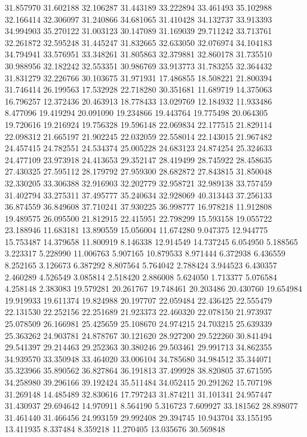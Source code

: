 31.857970
31.602188
32.106287
31.443189
33.222894
33.461493
35.102988
32.166414
32.306097
31.240866
34.681065
31.410428
34.132737
33.913393
34.994903
35.270122
31.003123
30.147089
31.169039
29.711242
33.713761
32.261872
32.595248
31.445247
31.832665
32.633050
32.076974
34.104183
34.794941
33.576951
33.348261
31.805863
32.379881
32.860178
31.735510
30.988956
32.182242
32.553351
30.986769
33.913773
31.783255
32.364432
31.831279
32.226766
30.103675
31.971931
17.486855
18.508221
21.800394
31.746414
26.199563
17.532928
22.718280
30.351681
11.689719
14.375063
16.796257
12.372436
20.463913
18.778433
13.029769
12.184932
11.933486
8.477096
19.419294
20.091090
19.234866
19.443764
19.775498
20.064305
19.720616
19.216924
19.756328
19.596148
22.069834
22.177515
21.829114
22.098312
21.665197
21.902245
22.032059
22.558014
22.143015
21.967482
24.457415
24.782551
24.534374
25.005228
24.683123
24.874254
25.324633
24.477109
23.973918
24.413653
29.352147
28.419499
28.745922
28.458635
27.430325
27.595112
28.179792
27.959300
28.682872
27.843815
31.850048
32.330205
33.306388
32.916903
32.202779
32.958721
32.989138
33.757459
31.402794
33.275311
37.495777
35.240634
32.928069
40.313443
37.256133
36.874559
36.849608
37.710241
37.930225
36.998777
16.978218
11.912808
19.489575
26.095500
21.812915
22.415951
22.798299
15.593158
19.055722
23.188946
11.683181
13.890559
15.056004
11.674280
9.047375
12.944775
15.753487
14.379658
11.800919
8.146338
12.914549
14.737245
6.054950
5.188565
3.223317
5.228990
11.006763
5.907165
10.879533
8.971444
6.372938
6.436559
8.252165
3.126673
6.387292
8.807564
5.764042
2.788424
3.944523
6.430357
2.460289
4.526549
3.085814
2.518420
2.886008
5.624050
1.713377
5.076584
4.258148
2.383083
19.579281
20.261767
19.748461
20.203486
20.430760
19.654984
19.919933
19.611374
19.824988
20.197707
22.059484
22.436425
22.555479
22.131530
22.252156
22.251689
21.923373
22.460320
22.078150
21.973937
25.078509
26.166981
25.425659
25.108670
24.974215
24.703215
25.639339
25.363262
24.903781
24.878767
30.121620
28.927200
29.522260
30.841494
29.541397
29.214463
29.252363
30.380246
29.503461
29.991713
34.862355
34.939570
33.350948
33.464020
33.006104
34.785680
34.984512
35.344071
35.323966
35.890562
36.827864
36.191813
37.499928
38.820805
37.671595
34.258980
39.296166
39.192424
35.511484
34.052415
20.291262
15.707198
31.269148
14.485489
32.830616
17.797243
31.874211
31.101341
24.957447
31.430937
29.694642
14.970911
8.564190
5.316723
7.609927
33.181562
28.898077
31.461440
31.466456
24.993159
29.992408
29.394745
10.943704
33.155195
13.411935
8.337484
8.359218
11.270405
13.035676
30.569848
